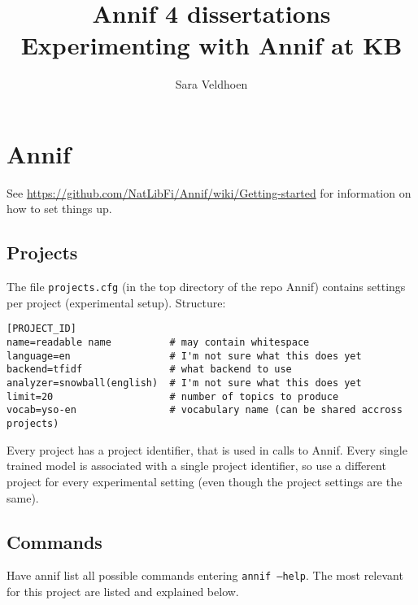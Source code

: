 \documentclass{article}
\title{Annif 4 dissertations\\Experimenting with Annif at KB}
\author{Sara Veldhoen}
\begin{document}
\maketitle

\tableofcontents

\clearpage

\section{Annif}

See \url{https://github.com/NatLibFi/Annif/wiki/Getting-started} for information on how to set things up.


\subsection{Projects}

The file {\tt projects.cfg} (in the top directory of the repo Annif) contains settings per project (experimental setup). Structure:
\begin{verbatim}[PROJECT_ID]
name=readable name          # may contain whitespace
language=en                 # I'm not sure what this does yet
backend=tfidf               # what backend to use 
analyzer=snowball(english)  # I'm not sure what this does yet
limit=20                    # number of topics to produce
vocab=yso-en                # vocabulary name (can be shared accross projects)
\end{verbatim}

Every project has a project identifier, that is used in calls to Annif. Every single trained model is associated with a single project identifier, so use a different project for every experimental setting (even though the project settings are the same). 
\subsection{Commands}

Have annif list all possible commands entering {\tt annif --help}. The most relevant for this project are listed and explained below.
\end{document}
